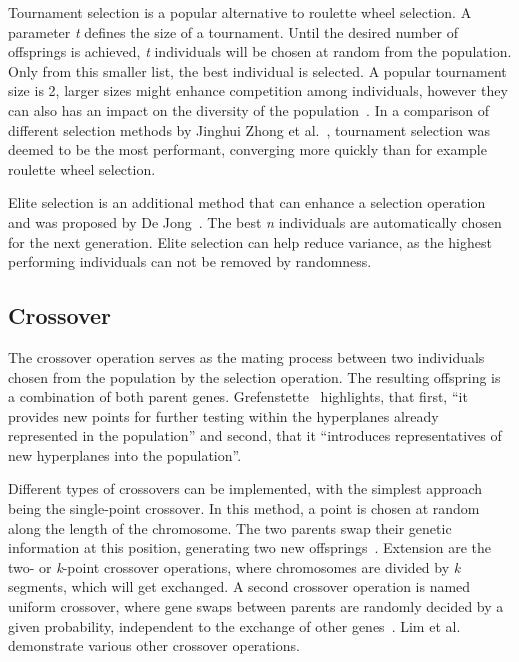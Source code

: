 Tournament selection is a popular alternative to roulette wheel selection. A parameter \textit{t} defines the size of a tournament. Until the desired number of offsprings is achieved, \textit{t} individuals will be chosen at random from the population. Only from this smaller list, the best individual is selected. A popular tournament size is 2, larger sizes might enhance competition among individuals, however they can also has an impact on the diversity of the population~\cite{hussain_trade-off_2020}. In a comparison of different selection methods by Jinghui Zhong et al.~\cite{jinghui_zhong_comparison_2005}, tournament selection was deemed to be the most performant, converging more quickly than for example roulette wheel selection.

Elite selection is an additional method that can enhance a selection operation and was proposed by De Jong~\cite{de_jong_analysis_1975}. The best \textit{n} individuals are automatically chosen for the next generation. Elite selection can help reduce variance, as the highest performing individuals can not be removed by randomness.

\subsection{Crossover}
The crossover operation serves as the mating process between two individuals chosen from the population by the selection operation. The resulting offspring is a combination of both parent genes. Grefenstette~\cite{grefenstette_optimization_1986} highlights, that first, \enquote{it provides new points for further testing within the hyperplanes already represented in the population} and second, that it \enquote{introduces representatives of new hyperplanes into the population}. 

Different types of crossovers can be implemented, with the simplest approach being the single-point crossover. In this method, a point is chosen at random along the length of the chromosome. The two parents swap their genetic information at this position, generating two new offsprings~\cite{katoch_review_2021}. Extension are the two- or \textit{k}-point crossover operations, where chromosomes are divided by \textit{k} segments, which will get exchanged. A second crossover operation is named uniform crossover, where gene swaps between parents are randomly decided by a given probability, independent to the exchange of other genes~\cite{katoch_review_2021}. Lim et al.~\cite{lim_crossover_2017} demonstrate various other crossover operations.


